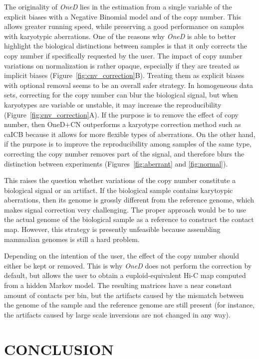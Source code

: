 \documentclass[a4,center,fleqn]{NAR}
\providecommand{\DIFadd}[1]{{\protect\color{red}#1}} %
\providecommand{\DIFaddbegin}{} %
\providecommand{\DIFaddend}{} %
\begin{document}
The originality of \textit{OneD} lies in the estimation from a single
variable of the explicit biases with a Negative Binomial model and of the
copy number. This allows greater running speed, while preserving a good
performance on samples with karyotypic aberrations. One of the reasons why
\textit{OneD} is able to better highlight the biological distinctions
between samples is that it only corrects the copy number if specifically
requested by the user. The impact of copy number variations on
normalization is rather opaque, especially if they are treated as implicit
biases (Figure~\ref{fig:cnv_correction}B). Treating them as explicit
biases with optional removal seems to be an overall safer strategy. In
homogeneous data sets, correcting for the copy number can blur the
biological signal, but when karyotypes are variable or unstable, it may
increase the reproducibility (Figure~\ref{fig:cnv_correction}A).
\DIFaddbegin \DIFadd{If the purpose is to remove the effect of copy number, then OneD+CN
outperforms a karyotype correction method such as caICB because it allows
for more flexible types of aberrations. On the other hand, if the purpose
is to improve the reproducibility among samples of the same type,
correcting the copy number removes part of the signal, and therefore blurs
the distinction between experiments (Figures~\ref{fig:aberrant} and
\ref{fig:normal}).
}\DIFaddend 

This raises the question whether variations of the copy number constitute
a biological signal or an artifact. If the biological sample contains
karytoypic aberrations, then its genome is grossly different from the
reference genome, which makes signal correction very challenging. The
proper approach would be to use the actual genome of the biological sample
as a reference to construct the contact map. However, this strategy is
presently unfeasible because assembling mammalian genomes is still a hard
problem.

Depending on the intention of the user, the effect of the copy number
should either be kept or removed. This is why \textit{OneD} does not
perform the correction by default, but allows the user to obtain a
euploid-equivalent Hi-C map computed from a hidden Markov model. The
resulting matrices have a near constant amount of contacts per bin, but
the artifacts caused by the mismatch between the genome of the sample and
the reference genome are still present (for instance, the artifacts caused
by large scale inversions are not changed in any way).


\section{CONCLUSION}
\end{document}
